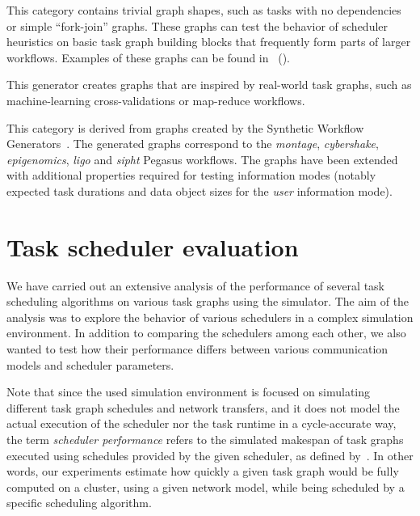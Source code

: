 \begin{description}[wide=0pt,itemsep=0pt,topsep=4pt]
	\item[elementary] This category contains trivial graph shapes, such as tasks with no dependencies or simple
		``fork-join'' graphs. These graphs can test the behavior of scheduler heuristics on basic task
		graph building blocks that frequently form parts of larger workflows. Examples of these graphs can
		be found in~ ().

	\item[irw] This generator creates graphs that are inspired by real-world task graphs, such as machine-learning
		cross-validations or map-reduce workflows.

	\item[pegasus] This category is derived from graphs created by the Synthetic Workflow
		Generators~\cite{pegasusgraphs}. The generated graphs correspond to the \emph{montage},
		\emph{cybershake}, \emph{epigenomics}, \emph{ligo} and \emph{sipht}
		Pegasus workflows. The graphs have been extended with additional properties required for testing
		information modes (notably expected task durations and data object sizes for the
		\emph{user} information mode).
\end{description}

\section{Task scheduler evaluation}
\label{sec:estee-benchmarks}
We have carried out an extensive analysis of the performance of several task scheduling algorithms
on various task graphs using the \estee{} simulator. The aim of the analysis was to
explore the behavior of various schedulers in a complex simulation environment. In addition to
comparing the schedulers among each other, we also wanted to test how their performance differs
between various communication models and scheduler parameters.

Note that since the used simulation environment is focused on simulating different task graph
schedules and network transfers, and it does not model the actual execution of the scheduler nor
the task runtime in a cycle-accurate way, the term \emph{scheduler performance} refers to the simulated
makespan of task graphs executed using schedules provided by the given scheduler, as defined
by~. In other words, our experiments estimate how quickly a given task
graph would be fully computed on a cluster, using a given network model, while being scheduled by a specific scheduling algorithm.

